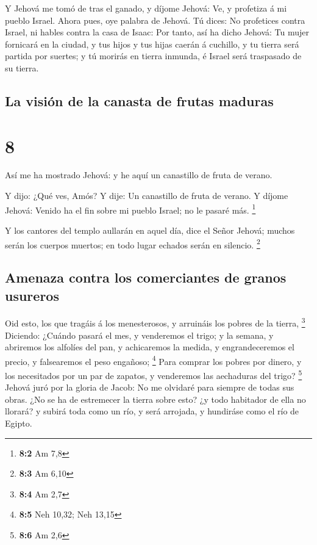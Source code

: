  Y Jehová me tomó de tras el ganado, y díjome Jehová: Ve, y
profetiza á mi pueblo Israel.  Ahora pues, oye palabra de
Jehová. Tú dices: No profetices contra Israel, ni hables contra la casa
de Isaac:  Por tanto, así ha dicho Jehová: Tu mujer
fornicará en la ciudad, y tus hijos y tus hijas caerán á cuchillo, y tu
tierra será partida por suertes; y tú morirás en tierra inmunda, é
Israel será traspasado de su tierra.

\hypertarget{la-visiuxf3n-de-la-canasta-de-frutas-maduras}{%
\subsection{La visión de la canasta de frutas
maduras}\label{la-visiuxf3n-de-la-canasta-de-frutas-maduras}}

\hypertarget{section-7}{%
\section{8}\label{section-7}}

 Así me ha mostrado Jehová: y he aquí un canastillo de fruta
de verano.

 Y dijo: ¿Qué ves, Amós? Y dije: Un canastillo de fruta de
verano. Y díjome Jehová: Venido ha el fin sobre mi pueblo Israel; no le
pasaré más. \footnote{\textbf{8:2} Am 7,8}

 Y los cantores del templo aullarán en aquel día, dice el
Señor Jehová; muchos serán los cuerpos muertos; en todo lugar echados
serán en silencio. \footnote{\textbf{8:3} Am 6,10}

\hypertarget{amenaza-contra-los-comerciantes-de-granos-usureros}{%
\subsection{Amenaza contra los comerciantes de granos
usureros}\label{amenaza-contra-los-comerciantes-de-granos-usureros}}

 Oid esto, los que tragáis á los menesterosos, y arruináis
los pobres de la tierra, \footnote{\textbf{8:4} Am 2,7} 
Diciendo: ¿Cuándo pasará el mes, y venderemos el trigo; y la semana, y
abriremos los alfolíes del pan, y achicaremos la medida, y
engrandeceremos el precio, y falsearemos el peso engañoso; \footnote{\textbf{8:5}
  Neh 10,32; Neh 13,15}  Para comprar los pobres por dinero,
y los necesitados por un par de zapatos, y venderemos las aechaduras del
trigo? \footnote{\textbf{8:6} Am 2,6}  Jehová juró por la
gloria de Jacob: No me olvidaré para siempre de todas sus obras.
 ¿No se ha de estremecer la tierra sobre esto? ¿y todo
habitador de ella no llorará? y subirá toda como un río, y será
arrojada, y hundiráse como el río de Egipto.

